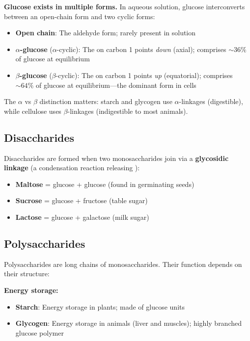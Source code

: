 \documentclass{report}
\begin{document}
\textbf{Glucose exists in multiple forms.} In aqueous solution, glucose interconverts between an open-chain form and two cyclic forms:
\begin{itemize}
    \item \textbf{Open chain}: The aldehyde form; rarely present in solution
    \item \textbf{\(\alpha\)-glucose} (\(\alpha\)-cyclic): The  on carbon 1 points \emph{down} (axial); comprises \(\sim 36\%\) of glucose at equilibrium
    \item \textbf{\(\beta\)-glucose} (\(\beta\)-cyclic): The  on carbon 1 points \emph{up} (equatorial); comprises \(\sim 64\%\) of glucose at equilibrium---the dominant form in cells
\end{itemize}
The \(\alpha\) vs \(\beta\) distinction matters: starch and glycogen use \(\alpha\)-linkages (digestible), while cellulose uses \(\beta\)-linkages (indigestible to most animals).

\subsection{Disaccharides}

Disaccharides are formed when two monosaccharides join via a \textbf{glycosidic linkage} (a condensation reaction releasing ):
\begin{itemize}
    \item \textbf{Maltose} = glucose + glucose (found in germinating seeds)
    \item \textbf{Sucrose} = glucose + fructose (table sugar)
    \item \textbf{Lactose} = glucose + galactose (milk sugar)
\end{itemize}

\subsection{Polysaccharides}

Polysaccharides are long chains of monosaccharides. Their function depends on their structure:

\textbf{Energy storage:}
\begin{itemize}
    \item \textbf{Starch}: Energy storage in plants; made of glucose units
    \item \textbf{Glycogen}: Energy storage in animals (liver and muscles); highly branched glucose polymer
\end{itemize}
\end{document}
